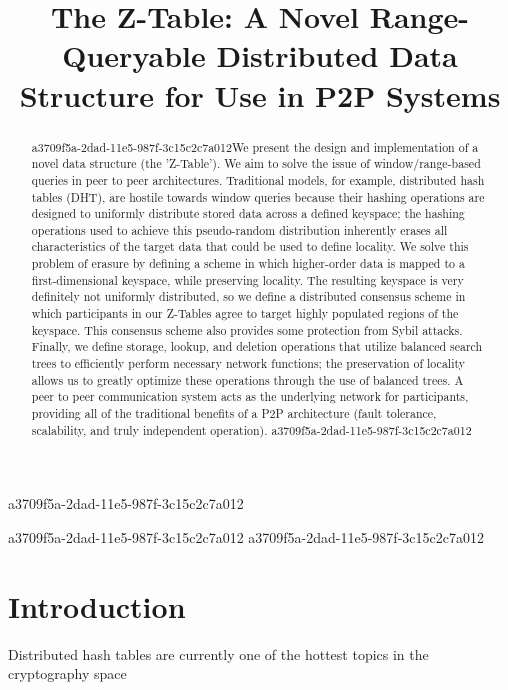\documentclass[12pt]{article}
\title{The Z-Table: A Novel Range-Queryable Distributed Data Structure for Use in P2P Systems}
\begin{document}
\maketitle

a3709f5a-2dad-11e5-987f-3c15c2c7a012\begin{abstract}
a3709f5a-2dad-11e5-987f-3c15c2c7a012We present the design and implementation of a novel data structure (the 'Z-Table'). We aim to solve the issue of window/range-based queries in peer to peer architectures. Traditional models, for example,  distributed hash tables (DHT), are hostile towards window queries because their hashing operations are designed to uniformly distribute stored data across a defined keyspace; the hashing operations used to achieve this pseudo-random distribution inherently erases all characteristics of the target data that could be used to define locality. We solve this problem of erasure by defining a scheme in which higher-order data is mapped to a first-dimensional keyspace, while preserving locality. The resulting keyspace is very definitely not uniformly distributed, so we define a distributed consensus scheme in which participants in our Z-Tables agree to target highly populated regions of the keyspace. This consensus scheme also provides some protection from Sybil attacks. Finally, we define storage, lookup, and deletion operations that utilize balanced search trees to efficiently perform necessary network functions; the preservation of locality allows us to greatly optimize these operations through the use of balanced trees. A peer to peer communication system acts as the underlying network for participants, providing all of the traditional benefits of a P2P architecture (fault tolerance, scalability, and truly independent operation).
a3709f5a-2dad-11e5-987f-3c15c2c7a012\end{abstract}
a3709f5a-2dad-11e5-987f-3c15c2c7a012
a3709f5a-2dad-11e5-987f-3c15c2c7a012
\newpage
\section{Introduction}
Distributed hash tables are currently one of the hottest topics in the cryptography space~\cite{Stoica:2001dj,Rowstron:2001ea,Ratnasamy:2001wn}

\printbibliography
\end{document}
